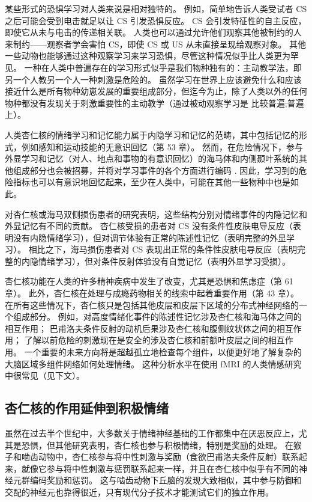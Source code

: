 某些形式的恐惧学习对人类来说是相对独特的。 例如，简单地告诉人类受试者 CS 之后可能会受到电击就足以让 CS 引发恐惧反应。 CS 会引发特征性的自主反应，即使它从未与电击的传递相关联。 人类也可以通过允许他们观察其他被制约的人来制约——观察者学会害怕 CS，即使 CS 或 US 从未直接呈现给观察对象。 其他一些动物也能够通过这种观察学习来学习恐惧，尽管这种情况似乎比人类更为罕见。 一种在人类中普遍存在的学习形式似乎是我们物种独有的：主动教学法，即另一个人教另一个人一种刺激是危险的。 虽然学习在世界上应该避免什么和应该接近什么是所有物种幼崽发展的重要组成部分，但迄今为止，除了人类以外的任何物种都没有发现关于刺激重要性的主动教学（通过被动观察学习是 比较普遍;普遍上）。

人类杏仁核的情绪学习和记忆能力属于内隐学习和记忆的范畴，其中包括记忆的形式，例如感知和运动技能的无意识回忆（第 53 章）。 然而，在危险情况下，参与外显学习和记忆（对人、地点和事物的有意识回忆）的海马体和内侧颞叶系统的其他组成部分也会被招募，并将对学习事件的各个方面进行编码 . 因此，学习到的危险指标也可以有意识地回忆起来，至少在人类中，可能在其他一些物种中也是如此。

对杏仁核或海马双侧损伤患者的研究表明，这些结构分别对情绪事件的内隐记忆和外显记忆有不同的贡献。 杏仁核受损的患者对 CS 没有条件性皮肤电导反应（表明没有内隐情绪学习），但对调节体验有正常的陈述性记忆（表明完整的外显学习）。 相比之下，海马损伤患者对 CS 表现出正常的条件性皮肤电导反应（表明完整的内隐情绪学习），但对条件反射体验没有自觉记忆（表明外显学习受损）。

杏仁核功能在人类的许多精神疾病中发生了改变，尤其是恐惧和焦虑症（第 61 章）。 此外，杏仁核在处理与成瘾药物相关的线索中起着重要作用（第 43 章）。 在所有这些情况下，杏仁核只是包括其他皮层和皮层下区域的分布式神经网络的一个组成部分。 例如，对高度情绪化事件的陈述性记忆涉及杏仁核和海马体之间的相互作用； 巴甫洛夫条件反射的动机后果涉及杏仁核和腹侧纹状体之间的相互作用； 了解以前危险的刺激现在是安全的涉及杏仁核和前额叶皮层之间的相互作用。 一个重要的未来方向将是超越孤立地检查每个组件，以便更好地了解复杂的大脑区域多组件网络如何处理情绪。 这种分析水平在使用 fMRI 的人类情感研究中很常见（见下文）。

\subsection{杏仁核的作用延伸到积极情绪}
虽然在过去半个世纪中，大多数关于情绪神经基础的工作都集中在厌恶反应上，尤其是恐惧，但其他研究表明，杏仁核也参与积极情绪，特别是奖励的处理。 在猴子和啮齿动物中，杏仁核参与将中性刺激与奖励（食欲巴甫洛夫条件反射）联系起来，就像它参与将中性刺激与惩罚联系起来一样，并且在杏仁核中似乎有不同的神经元群编码奖励和惩罚。 这与啮齿动物下丘脑的发现大致相似，其中参与防御和交配的神经元也靠得很近，只有现代分子技术才能测试它们的独立作用。


